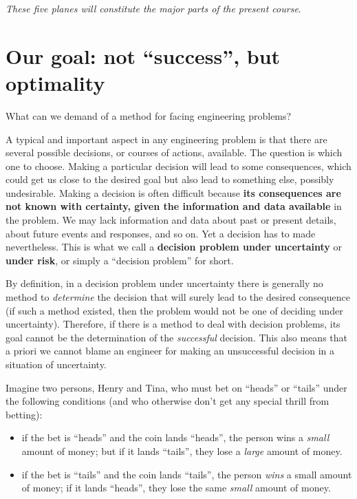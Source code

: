 \documentclass[
  a4paper,
  DIV=11,
  numbers=noendperiod,
  oneside]{scrreprt}
\providecommand{\tightlist}{%
  \setlength{\itemsep}{0pt}\setlength{\parskip}{0pt}}\usepackage{longtable,booktabs,array}
\begin{document}
\emph{These five planes will constitute the major parts of the present
course}.

\hypertarget{our-goal-not-success-but-optimality}{%
\section{Our goal: not ``success'', but
optimality}\label{our-goal-not-success-but-optimality}}

What can we demand of a method for facing engineering problems?

A typical and important aspect in any engineering problem is that there
are several possible decisions, or courses of actions, available. The
question is which one to choose. Making a particular decision will lead
to some consequences, which could get us close to the desired goal but
also lead to something else, possibly undesirable. Making a decision is
often difficult because \textbf{its consequences are not known with
certainty, given the information and data available} in the problem. We
may lack information and data about past or present details, about
future events and responses, and so on. Yet a decision has to made
nevertheless. This is what we call a {\textbf{decision problem under
uncertainty}} or {\textbf{under risk}}, or simply a ``decision problem''
for short.

By definition, in a decision problem under uncertainty there is
generally no method to \emph{determine} the decision that will surely
lead to the desired consequence (if such a method existed, then the
problem would not be one of deciding under uncertainty). Therefore, if
there is a method to deal with decision problems, its goal cannot be the
determination of the \emph{successful} decision. This also means that a
priori we cannot blame an engineer for making an unsuccessful decision
in a situation of uncertainty.

Imagine two persons, Henry and Tina, who must bet on ``heads'' or
``tails'' under the following conditions (and who otherwise don't get
any special thrill from betting):

\begin{itemize}
\tightlist
\item
  if the bet is ``heads'' and the coin lands ``heads'', the person wins
  a \emph{small} amount of money; but if it lands ``tails'', they lose a
  \emph{large} amount of money.
\item
  if the bet is ``tails'' and the coin lands ``tails'', the person
  \emph{wins} a small amount of money; if it lands ``heads'', they lose
  the same \emph{small} amount of money.
\end{itemize}
\end{document}

